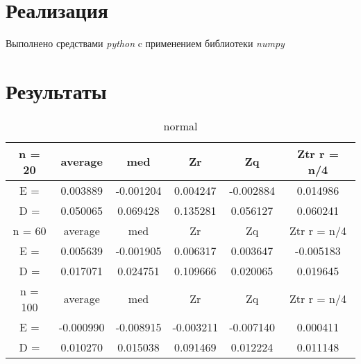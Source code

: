 \documentclass[12pt]{article}
\begin{document}
\pagebreak

\section{Реализация}
Выполнено средствами \textit{python} c применением библиотеки \textit{numpy}\cite{numpy}

\section{Результаты}

\begin{table}[H]
\caption{normal}
\label{tab:my_label1}
\begin{center}
\vspace{5mm}
\begin{tabular}{|c|c|c|c|c|c|}
\hline
n = 20    &average     &med         &Zr          &Zq          &Ztr r = n/4 \\
\hline
E =       &0.003889    &-0.001204   &0.004247    &-0.002884   &0.014986    \\
\hline
D =       &0.050065    &0.069428    &0.135281    &0.056127    &0.060241    \\
\hline
n = 60    &average     &med         &Zr          &Zq          &Ztr r = n/4 \\
\hline
E =       &0.005639    &-0.001905   &0.006317    &0.003647    &-0.005183   \\
\hline
D =       &0.017071    &0.024751    &0.109666    &0.020065    &0.019645    \\
\hline
n = 100   &average     &med         &Zr          &Zq          &Ztr r = n/4 \\
\hline
E =       &-0.000990   &-0.008915   &-0.003211   &-0.007140   &0.000411    \\
\hline
D =       &0.010270    &0.015038    &0.091469    &0.012224    &0.011148    \\
\hline
\end{tabular}
\end{center}
\end{table}
\end{document}
